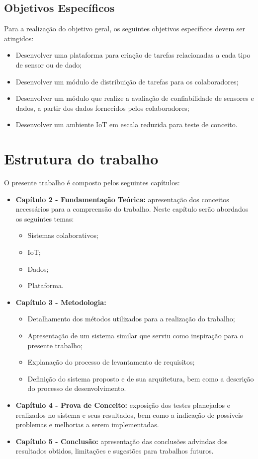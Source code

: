 \subsection{Objetivos Específicos}
Para a realização do objetivo geral, os seguintes objetivos específicos devem ser atingidos:
\begin{itemize}
  \item Desenvolver uma plataforma para criação de tarefas relacionadas a cada tipo de sensor ou de dado;
  \item Desenvolver um módulo de distribuição de tarefas para os colaboradores;
  \item Desenvolver um módulo que realize a avaliação de confiabilidade de sensores e dados, a partir dos dados fornecidos pelos colaboradores;
  \item Desenvolver um ambiente \acrshort{IoT} em escala reduzida para teste de conceito.
\end{itemize}
\section{Estrutura do trabalho}
O presente trabalho é composto pelos seguintes capítulos:
\begin{itemize}
  \item \textbf{Capítulo 2 - Fundamentação Teórica:} apresentação dos conceitos necessários para a compreensão do
  trabalho. Neste capítulo serão abordados os seguintes temas:
  \begin{itemize}
    \item Sistemas colaborativos;
    \item \acrlong{IoT};
    \item Dados;
    \item Plataforma.
  \end{itemize}
  \item \textbf{Capítulo 3 - Metodologia:}
\begin{itemize}
  \item Detalhamento dos métodos utilizados para a realização do trabalho;
  \item Apresentação de um sistema similar que serviu como inspiração para o presente trabalho;
  \item Explanação do processo de levantamento de requisitos;
  \item Definição do sistema proposto e de sua arquitetura, bem como a descrição do processo de desenvolvimento.
\end{itemize}
  \item \textbf{Capítulo 4 - Prova de Conceito:} exposição dos testes planejados e realizados no sistema e seus resultados, bem como a indicação de possíveis problemas e melhorias a serem implementadas.
  \item \textbf{Capítulo 5 - Conclusão:} apresentação das conclusões advindas dos resultados obtidos, limitações e
  sugestões para trabalhos futuros.
\end{itemize}
